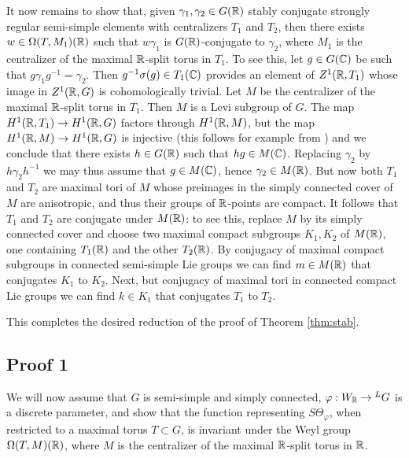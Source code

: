 \documentclass{article}
\theoremstyle{definition}
\numberwithin{equation}{section}
\renewcommand{\-}{\hyp{}}
\begin{document}
It now remains to show that, given $\gamma_1,\gamma_2 \in G(\mathbb{R})$ stably conjugate strongly regular semi-simple elements with centralizers $T_1$ and $T_2$, then there exists $w \in \Omega(T,M_1)(\mathbb{R})$ such that $w\gamma_1$ is $G(\mathbb{R})$-conjugate to $\gamma_2$, where $M_1$ is the centralizer of the maximal $\mathbb{R}$-split torus in $T_1$. To see this, let $g \in G(\mathbb{C})$ be such that $g\gamma_1g^{-1}=\gamma_2$. Then $g^{-1}\sigma(g) \in T_1(\mathbb{C})$ provides an element of $Z^1(\mathbb{R},T_1)$ whose image in $Z^1(\mathbb{R},G)$ is cohomologically trivial. Let $M$ be the centralizer of the maximal $\mathbb{R}$-split torus in $T_1$. Then $M$ is a Levi subgroup of $G$. The map $H^1(\mathbb{R},T_1) \to H^1(\mathbb{R},G)$ factors through $H^1(\mathbb{R},M)$, but the map $H^1(\mathbb{R},M) \to H^1(\mathbb{R},G)$ is injective (this follows for example from \cite[Proposition 7.3]{AT18})
and we conclude that there exists $h \in G(\mathbb{R})$ such that $hg \in M(\mathbb{C})$. Replacing $\gamma_2$ by $h\gamma_2h^{-1}$ we may thus assume that $g \in M(\mathbb{C})$, hence $\gamma_2 \in M(\mathbb{R})$. But now both $T_1$ and $T_2$ are maximal tori of $M$ whose preimages in the simply connected cover of $M$ are anisotropic, and thus their groups of $\mathbb{R}$-points are compact. It follows that $T_1$ and $T_2$ are conjugate under $M(\mathbb{R})$: to see this, replace $M$ by its simply connected cover and choose two maximal compact subgroups $K_1,K_2$ of $M(\mathbb{R})$, one containing $T_1(\mathbb{R})$ and the other $T_2(\mathbb{R})$. By conjugacy of maximal compact subgroups in connected semi-simple Lie groups we can find $m \in M(\mathbb{R})$ that conjugates $K_1$ to $K_2$. Next, but conjugacy of maximal tori in connected compact Lie groups we can find $k \in K_1$ that conjugates $T_1$ to $T_2$.

This completes the desired reduction of the proof of Theorem \ref{thm:stab}.


\subsection{Proof 1}

We will now assume that $G$ is semi-simple and simply connected, $\varphi : W_{\mathbb{R}} \to {^LG}$ is a discrete parameter, and show that the function representing $S\Theta_\varphi$, when restricted to a maximal torus $T \subset G$, is invariant under the Weyl group $\Omega(T,M)(\mathbb{R})$, where $M$ is the centralizer of the maximal $\mathbb{R}$-split torus in $\mathbb{R}$.
\end{document}
